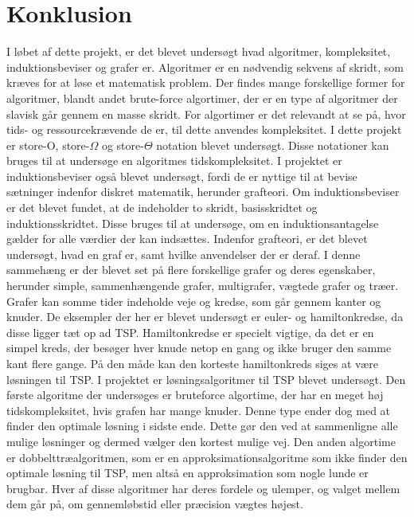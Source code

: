 \chapter{Konklusion}


I løbet af dette projekt, er det blevet undersøgt hvad algoritmer, kompleksitet, induktionsbeviser og grafer er. 
Algoritmer er en nødvendig sekvens af skridt, som kræves for at løse et matematisk problem. 
Der findes mange forskellige former for algoritmer, blandt andet brute-force algortimer, der er en type af algoritmer der slavisk går gennem en masse skridt. 
For algortimer er det relevandt at se på, hvor tids- og ressourcekrævende de er, til dette anvendes kompleksitet. 
I dette projekt er store-O, store-$\Omega$ og store-$\Theta$ notation blevet undersøgt. 
Disse notationer kan bruges til at undersøge en algoritmes tidskompleksitet. 
I projektet er induktionsbeviser også blevet undersøgt, fordi de er nyttige til at bevise sætninger indenfor diskret matematik, herunder grafteori. 
Om induktionsbeviser er det blevet fundet, at de indeholder to skridt, basisskridtet og induktionsskridtet.
Disse bruges til at undersøge, om en induktionsantagelse gælder for alle værdier der kan indsættes. 
Indenfor grafteori, er det blevet undersøgt, hvad en graf er, samt hvilke anvendelser der er deraf. 
I denne sammehæng er der blevet set på flere forskellige grafer og deres egenskaber, herunder  simple, sammenhængende grafer, multigrafer, vægtede grafer og træer. 
Grafer kan somme tider indeholde veje og kredse, som går gennem kanter og knuder. 
De eksempler der her er blevet undersøgt er euler- og hamiltonkredse, da disse ligger tæt op ad TSP. 
Hamiltonkredse er specielt vigtige, da det er en simpel kreds, der besøger hver knude netop en gang og ikke bruger den samme kant flere gange.
På den måde kan den korteste hamiltonkreds siges at være løsningen til TSP. 
I projektet er løsningsalgoritmer til TSP blevet undersøgt. 
Den første algoritme der undersøges er bruteforce algortime, der har en meget høj tidskompleksitet, hvis grafen har mange knuder. Denne type ender dog med at finder den optimale løsning i sidste ende. Dette gør den ved at sammenligne alle mulige løsninger og dermed vælger den kortest mulige vej.  
Den anden algortime er dobbelttræalgoritmen, som er en approksimationsalgoritme som ikke finder den optimale løsning til TSP, men altså en approksimation som nogle lunde er brugbar. 
Hver af disse algoritmer har deres fordele og ulemper, og valget mellem dem går på, om gennemløbstid eller præcision vægtes højest. 
